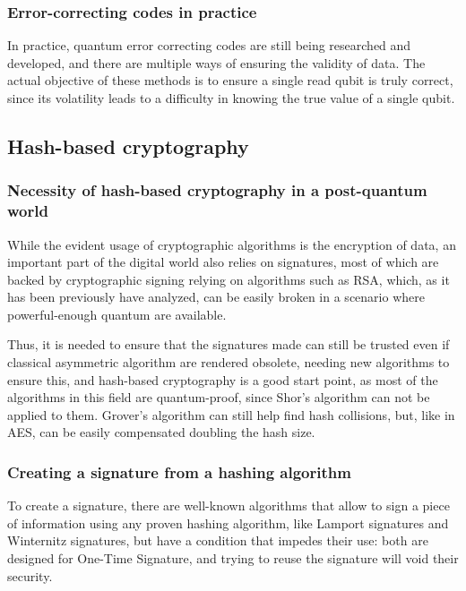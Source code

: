 \subsubsection{Error-correcting codes in practice}

In practice, quantum error correcting codes are still being researched and
developed, and there are multiple ways of ensuring the validity of data. The
actual objective of these methods is to ensure a single read qubit is truly
correct, since its volatility leads to a difficulty in knowing the true value of
a single qubit.

\pagebreak
\subsection{Hash-based cryptography}
\subsubsection{Necessity of hash-based cryptography in a post-quantum world}

While the evident usage of cryptographic algorithms is the encryption of data, an important part of the
digital world also relies on signatures, most of which are backed by cryptographic signing relying on
algorithms such as RSA, which, as it has been previously have analyzed, can be easily broken in a scenario
where powerful-enough quantum are available.

Thus, it is needed to ensure that the signatures made can still be trusted even if classical asymmetric
algorithm are rendered obsolete, needing new algorithms to ensure this, and hash-based cryptography is a
good start point, as most of the algorithms in this field are quantum-proof, since Shor's algorithm can not
be applied to them. Grover's algorithm can still help find hash collisions, but, like in AES, can be easily
compensated doubling the hash size.

\subsubsection{Creating a signature from a hashing algorithm}

To create a signature, there are well-known algorithms that allow to sign a piece of information using any
proven hashing algorithm, like Lamport signatures and Winternitz signatures, but have a condition that
impedes their use: both are designed for One-Time Signature, and trying to reuse the signature will
void their security.


